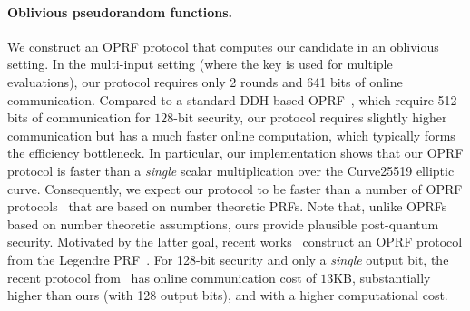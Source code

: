 \paragraph{Oblivious pseudorandom functions.}
We construct an OPRF protocol that computes our \ttwPRF candidate in an oblivious setting. In the multi-input setting (where the key is used for multiple evaluations), our protocol requires only 2 rounds and 641 bits of online communication.
Compared to a standard DDH-based OPRF~\cite{jarecki2014-ddhoprf,jarecki2016-ddhoprf}, which require 512 bits of communication for $128$-bit security, our protocol requires slightly higher communication but has a much faster online computation, which typically forms the efficiency bottleneck. In particular, our implementation shows that our OPRF protocol is faster than a \textit{single} scalar multiplication over the Curve25519 elliptic curve. Consequently, we expect our protocol to be faster than a number of OPRF protocols~\cite{freedman2005-oprf,jarecki2009-oprf} that are based on number theoretic PRFs. Note that, unlike OPRFs based on number theoretic assumptions, ours provide plausible post-quantum security. 
% 
Motivated by the latter goal, recent works~\cite{grassi2016-mpcfriendly,seres2021-legendre} construct an OPRF protocol from the Legendre PRF~\cite{damgard1988-legendre}. For 128-bit security and only a {\em single} output bit, the recent protocol from~\cite{seres2021-legendre} has online communication cost of $13$KB, substantially higher than ours (with 128 output bits), and with a higher computational cost. 




